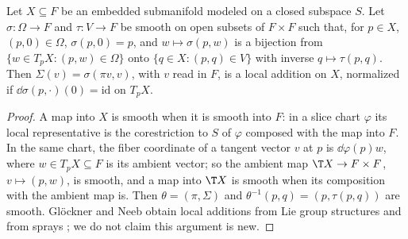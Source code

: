 \begin{proposition}
  \label{prop:ambient-local-addition}
  \leanok
  Let $X \subseteq F$ be an embedded submanifold modeled on a closed subspace $S$. Let
  $\sigma \colon \Omega \to F$ and $\tau \colon V \to F$ be smooth on open subsets of $F \times F$
  such that, for $p \in X$, $(p, 0) \in \Omega$, $\sigma(p, 0) = p$, and $w \mapsto \sigma(p, w)$ is a
  bijection from $\{w \in T_pX : (p, w) \in \Omega\}$ onto $\{q \in X : (p, q) \in V\}$ with inverse
  $q \mapsto \tau(p, q)$. Then $\Sigma(v) = \sigma(\pi v, v)$, with $v$ read in $F$, is a local
  addition on $X$, normalized if $\dd\sigma(p, \cdot)(0) = \mathrm{id}$ on $T_pX$.
\end{proposition}

\begin{proof}
  \leanok
  A map into $X$ is smooth when it is smooth into $F$: in a slice chart $\varphi$ its local
  representative is the corestriction to $S$ of $\varphi$ composed with the map into $F$. In the
  same chart, the fiber coordinate of a tangent vector $v$ at $p$ is $\dd\varphi(p) w$, where
  $w \in T_pX \subseteq F$ is its ambient vector; so the ambient map $\T X \to F \times F$,
  $v \mapsto (p, w)$, is smooth, and a map into $\T X$ is smooth when its composition with the
  ambient map is. Then $\theta = (\pi, \Sigma)$ and $\theta^{-1}(p, q) = (p, \tau(p, q))$ are
  smooth. Glöckner and Neeb obtain local additions from Lie group structures and from sprays
  \cite[Prop.~3.8.12, Prop.~3.8.13]{GN26}; we do not claim this argument is new.
\end{proof}

